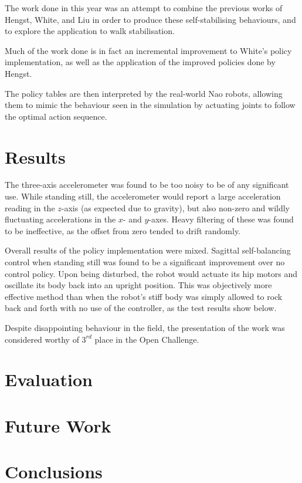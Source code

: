 The work done in this year was an attempt to combine the previous works of Hengst, White, and Liu in order to produce these self-stabilising behaviours, and to explore the application to walk stabilisation.


Much of the work done is in fact an incremental improvement to White's policy implementation, as well as the application of the improved policies done by Hengst.


The policy tables are then interpreted by the real-world Nao robots, allowing them to mimic the behaviour seen in the simulation by actuating joints to follow the optimal action sequence.

\section{Results}

The three-axis accelerometer was found to be too noisy to be of any significant use. While standing still, the accelerometer would report a large acceleration reading in the $z$-axis (as expected due to gravity), but also non-zero and wildly fluctuating accelerations in the $x$- and $y$-axes. Heavy filtering of these was found to be ineffective, as the offset from zero tended to drift randomly.



Overall results of the policy implementation were mixed. Sagittal self-balancing control when standing still was found to be a significant improvement over no control policy. Upon being disturbed, the robot would actuate its hip motors and oscillate its body back into an upright position. This was objectively more effective method than when the robot's stiff body was simply allowed to rock back and forth with no use of the controller, as the test results show below.



Despite disappointing behaviour in the field, the presentation of the work was considered worthy of $3^{rd}$ place in the Open Challenge.



\section{Evaluation}
\section{Future Work}
\section{Conclusions}
